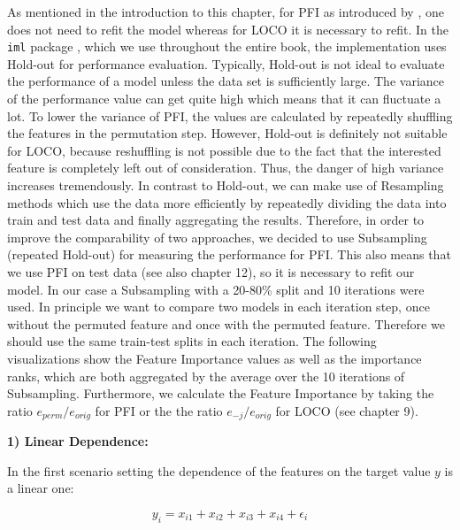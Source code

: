 \documentclass[
]{krantz}
\begin{document}
As mentioned in the introduction to this chapter, for PFI as introduced by \citet{breiman2001random}, one does not need to refit the model whereas for LOCO it is necessary to refit. In the \texttt{iml} package \citep{molnar2018iml}, which we use throughout the entire book, the implementation uses Hold-out for performance evaluation. Typically, Hold-out is not ideal to evaluate the performance of a model unless the data set is sufficiently large. The variance of the performance value can get quite high which means that it can fluctuate a lot. To lower the variance of PFI, the values are calculated by repeatedly shuffling the features in the permutation step. However, Hold-out is definitely not suitable for LOCO, because reshuffling is not possible due to the fact that the interested feature is completely left out of consideration. Thus, the danger of high variance increases tremendously. In contrast to Hold-out, we can make use of Resampling methods which use the data more efficiently by repeatedly dividing the data into train and test data and finally aggregating the results. Therefore, in order to improve the
comparability of two approaches, we decided to use Subsampling (repeated Hold-out) for measuring the performance for PFI. This also means that we use PFI on test data (see also chapter 12), so it is necessary to refit our model. In our case a Subsampling with a 20-80\% split and 10 iterations were used. In principle we want to compare two models in each iteration step, once without the permuted feature and once with the permuted feature. Therefore we should use the same train-test splits in each iteration. The following visualizations show the Feature Importance values as well as the importance ranks, which are both aggregated by the average over the 10 iterations of Subsampling. Furthermore, we calculate the Feature Importance by taking the ratio \(e_{perm}/e_{orig}\) for PFI or the the ratio \(e_{-j}/e_{orig}\) for LOCO (see chapter 9).

\textbf{1) Linear Dependence:}

In the first scenario setting the dependence of the features on the target value \(y\) is a linear one:

\[
y_{i} = x_{i1}+x_{i2}+x_{i3}+x_{i4}+\epsilon_{i}
\]
\end{document}
